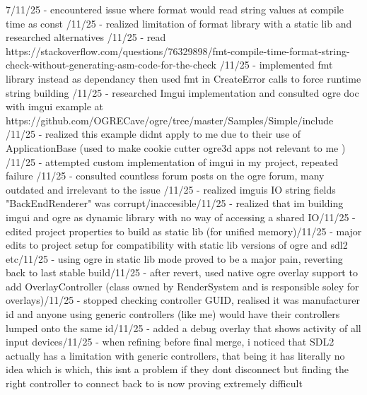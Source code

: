\documentclass[]{final_report}
\begin{document}
7/11/25 - encountered issue where format would read string values at compile time as const /11/25 - realized limitation of format library with a static lib and researched alternatives /11/25 - read https://stackoverflow.com/questions/76329898/fmt-compile-time-format-string-check-without-generating-asm-code-for-the-check /11/25 - implemented fmt library instead as dependancy then used fmt in CreateError calls to force runtime string building /11/25 - researched Imgui implementation and consulted ogre doc with imgui example at https://github.com/OGRECave/ogre/tree/master/Samples/Simple/include /11/25 - realized this example didnt apply to me due to their use of ApplicationBase (used to make cookie cutter ogre3d apps not relevant to me ) /11/25 - attempted custom implementation of imgui in my project, repeated failure /11/25 - consulted countless forum posts on the ogre forum, many outdated and irrelevant to the issue /11/25 - realized imguis IO string fields "BackEndRenderer" was corrupt/inaccesible/11/25 - realized that im building imgui and ogre as dynamic library with no way of accessing a shared IO/11/25 - edited project properties to build as static lib (for unified memory)/11/25 - major edits to project setup for compatibility with static lib versions of ogre and sdl2 etc/11/25 - using ogre in static lib mode proved to be a major pain, reverting back to last stable build/11/25 - after revert, used native ogre overlay support to add OverlayController (class owned by RenderSystem and is responsible soley for overlays)/11/25 - stopped checking controller GUID, realised it was manufacturer id and anyone using generic controllers (like me) would have their controllers lumped onto the same id/11/25 - added a debug overlay that shows activity of all input devices/11/25 - when refining before final merge, i noticed that SDL2 actually has a limitation with generic controllers, that being it has literally no idea which is which, this isnt a problem if they dont disconnect but finding the right controller to connect back to is now proving extremely difficult\newline
\end{document}
